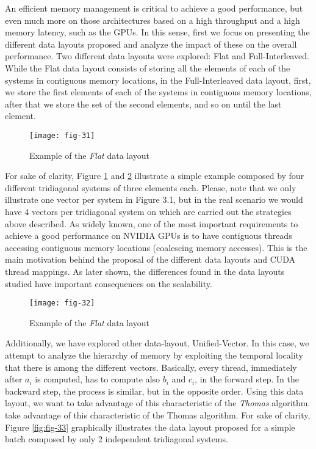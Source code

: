 An efficient memory management is critical to achieve a good performance, but even
much more on those architectures based on a high throughput and a high memory
latency, such as the GPUs. In this sense, first we focus on presenting the different data
layouts proposed and analyze the impact of these on the overall performance. Two
different data layouts were explored: Flat and Full-Interleaved. While the Flat data
layout consists of storing all the elements of each of the systems in contiguous memory
locations, in the Full-Interleaved data layout, first, we store the first elements of each
of the systems in contiguous memory locations, after that we store the set of the second
elements, and so on until the last element.

\begin{figure}[htbp]
    \centering
    \texttt{[image: fig-31]}
    \caption{Example of the \textit{Flat} data layout}
    \label{fig:fig-31}
\end{figure}

For sake of clarity, Figure \ref{fig:fig-31} and \ref{fig:fig-32} illustrate a simple example composed by four
different tridiagonal systems of three elements each. Please, note that we only illustrate
one vector per system in Figure 3.1, but in the real scenario we would have 4 vectors
per tridiagonal system on which are carried out the strategies above described. As
widely known, one of the most important requirements to achieve a good performance
on NVIDIA GPUs is to have contiguous threads accessing contiguous memory locations
(coalescing memory accesses). This is the main motivation behind the proposal of the
different data layouts and CUDA thread mappings. As later shown, the differences
found in the data layouts studied have important consequences on the scalability.

\begin{figure}[htbp]
    \centering
    \texttt{[image: fig-32]}
    \caption{Example of the \textit{Flat} data layout}
    \label{fig:fig-32}
\end{figure}

Additionally, we have explored other data-layout, Unified-Vector. In this case, we
attempt to analyze the hierarchy of memory by exploiting the temporal locality that
there is among the different vectors. Basically, every
thread, immediately after $a_i$ is computed, has to compute also 
$b_i$ and $c_i$, in the forward step. In the backward step, the process
is similar, but in the opposite order. Using this data layout, we want to take advantage of
this characteristic of the \textit{Thomas} algorithm.
take advantage of this characteristic of the Thomas algorithm.
For sake of clarity, Figure \ref{fig:fig-33} 
graphically illustrates the data layout proposed for a simple batch 
composed by only 2 independent tridiagonal systems.

